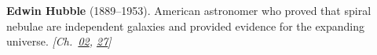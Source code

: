 \textbf{Edwin Hubble} (1889–1953). American astronomer who proved that spiral nebulae are independent galaxies and provided evidence for the expanding universe. \emph{[Ch.~\hyperref[ch:acceleratinguniverse]{02}, \hyperref[ch:planetaryskycolors]{27}]}

